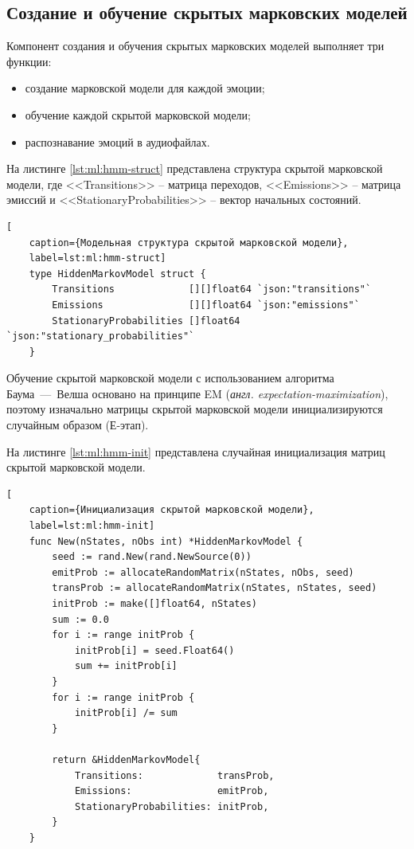 \subsection{Создание и обучение скрытых марковских моделей}
Компонент создания и обучения скрытых марковских моделей выполняет три функции:
\begin{itemize}
	\item создание марковской модели для каждой эмоции;
	\item обучение каждой скрытой марковской модели;
	\item распознавание эмоций в аудиофайлах.
\end{itemize}
На листинге \ref{lst:ml:hmm-struct} представлена структура скрытой марковской модели, где <<Transitions>> -- матрица переходов, <<Emissions>> -- матрица эмиссий и <<StationaryProbabilities>> -- вектор начальных состояний.
\begin{lstlisting}[
	caption={Модельная структура скрытой марковской модели},
	label=lst:ml:hmm-struct]
	type HiddenMarkovModel struct {
		Transitions             [][]float64 `json:"transitions"`
		Emissions               [][]float64 `json:"emissions"`
		StationaryProbabilities []float64   `json:"stationary_probabilities"`
	}
\end{lstlisting}
Обучение скрытой марковской модели с использованием алгоритма Баума~---~Велша основано на принципе EM (\textit{англ. expectation-maximization}), поэтому изначально матрицы скрытой марковской модели инициализируются случайным образом (Е-этап).

На листинге \ref{lst:ml:hmm-init} представлена случайная инициализация матриц скрытой марковской модели.
\begin{lstlisting}[
	caption={Инициализация скрытой марковской модели},
	label=lst:ml:hmm-init]
	func New(nStates, nObs int) *HiddenMarkovModel {
		seed := rand.New(rand.NewSource(0))
		emitProb := allocateRandomMatrix(nStates, nObs, seed)
		transProb := allocateRandomMatrix(nStates, nStates, seed)
		initProb := make([]float64, nStates)
		sum := 0.0
		for i := range initProb {
			initProb[i] = seed.Float64()
			sum += initProb[i]
		}
		for i := range initProb {
			initProb[i] /= sum
		}
		
		return &HiddenMarkovModel{
			Transitions:             transProb,
			Emissions:               emitProb,
			StationaryProbabilities: initProb,
		}
	}
\end{lstlisting}


